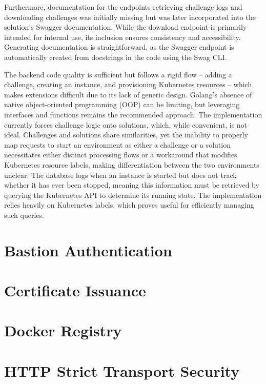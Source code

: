 Furthermore, documentation for the endpoints retrieving challenge logs and downloading challenges was initially missing but was later incorporated into the solution's Swagger documentation. While the download endpoint is primarily intended for internal use, its inclusion ensures consistency and accessibility. Generating documentation is straightforward, as the Swagger endpoint is automatically created from docstrings in the code using the Swag CLI.

The backend code quality is sufficient but follows a rigid flow -- adding a challenge, creating an instance, and provisioning Kubernetes resources -- which makes extensions difficult due to its lack of generic design. Golang's absence of native object-oriented programming (OOP) can be limiting, but leveraging interfaces and functions remains the recommended approach. The implementation currently forces challenge logic onto solutions, which, while convenient, is not ideal. Challenges and solutions share similarities, yet the inability to properly map requests to start an environment as either a challenge or a solution necessitates either distinct processing flows or a workaround that modifies Kubernetes resource labels, making differentiation between the two environments unclear. The database logs when an instance is started but does not track whether it has ever been stopped, meaning this information must be retrieved by querying the Kubernetes API to determine its running state. The implementation relies heavily on Kubernetes labels, which proves useful for efficiently managing such queries.

\newpage

\section{Bastion Authentication}

\section{Certificate Issuance}

\section{Docker Registry}

\section{HTTP Strict Transport Security}

